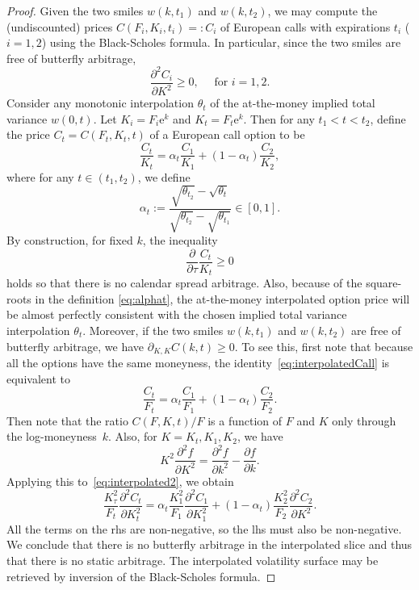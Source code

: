 \documentclass[12pt]{article}
\numberwithin{equation}{section}
\newcommand{\Ex}{\mathrm{e}}
\newcommand{\p}{\partial}
\newcommand{\beq}{\begin{equation}}
\newcommand{\eeq}{\end{equation}}
\begin{document}
\begin{proof}
Given the two smiles $w(k,t_1)$ and $w(k,t_2)$, we may compute the (undiscounted) prices $C(F_i,K_i,t_i)=:C_i$ of European calls with expirations $t_i$ ($i=1,2$) using the Black-Scholes formula.
In particular, since the two smiles are free of butterfly arbitrage,
\[
\frac{\p ^2 C_i}{\p K^2} \geq 0,\quad \text{ for }i=1,2.
\]
Consider any monotonic interpolation $\theta_t$ of the at-the-money implied total variance $w(0,t)$.
Let $K_i=F_i\Ex^k$ and $K_t=F_t\Ex^k$.
Then for any $t_1<t<t_2$, define the price $C_t=C(F_t,K_t,t)$ of a European call option to be
\beq
\frac{C_t}{K_t}=\alpha_t\frac{C_1}{K_1}+\left(1-\alpha_t\right)\frac{C_2}{K_2},
\label{eq:interpolatedCall}
\eeq
where for any $t\in \left(t_1,t_2\right)$, we define
\beq
\alpha_t:=\frac{\sqrt{\theta_{t_2}}-\sqrt{\theta_{t}}}{\sqrt{\theta_{t_2}}-\sqrt{\theta_{t_1}}}\in\left[0,1\right].
\label{eq:alphat}
\eeq
By construction, for fixed $k$, the inequality
\[
\frac{\p}{\p\tau} \frac{C_t}{K_t} \geq 0
\]
holds so that there is no calendar spread arbitrage.  Also, because of the square-roots in the definition \eqref{eq:alphat}, the at-the-money interpolated option price will be almost perfectly consistent with the chosen implied total variance interpolation $\theta_{t}$.
Moreover, if the two smiles $w(k,t_1)$ and $w(k,t_2)$ are free of butterfly arbitrage, we have $\p_{K,K} C(k,t) \geq 0$.
To see this, first note that because all the options have the same moneyness, the identity~\eqref{eq:interpolatedCall} is equivalent to
\beq
\frac{C_t}{F_t}=\alpha_t\frac{C_1}{F_1}+\left(1-\alpha_t\right)\frac{C_2}{F_2}.
\label{eq:interpolated2}
\eeq
Then note that the ratio $C(F,K,t)/F$ is a function of $F$ and $K$ only through the log-moneyness~$k$.
Also, for $K=K_t, K_1, K_2$, we have
\[
K^2\frac{\p^2 f}{\p K^2}=\frac{\p^2 f}{\p k^2}-\frac{\p f }{\p k}.
\]
Applying this to~\eqref{eq:interpolated2}, we obtain
$$
\frac{K_\tau^2}{F_t}\frac{\partial^2 C_t}{\partial K_t^2}
=\alpha_t\frac{K_1^2}{F_1}\frac{\partial^2 C_1}{\partial K_1^2}
+\left(1-\alpha_t\right)\frac{K_2^2}{F_2}\frac{\partial^2 C_2}{\partial K^2}.
$$
All the terms on the rhs are non-negative, so the lhs must also be non-negative. We conclude that there is no butterfly arbitrage in the interpolated slice and thus that there is no static arbitrage.
The interpolated volatility surface may be retrieved by inversion of the Black-Scholes formula.
\end{proof}
\end{document}
